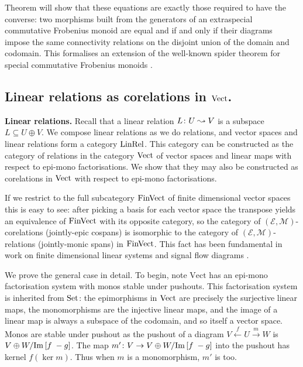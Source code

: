 Theorem will show that these equations are exactly those required to
have the converse: two morphisms built from the generators of an extraspecial
commutative Frobenius monoid are equal and if and only if their diagrams impose
the same connectivity relations on the disjoint union of the domain and
codomain. This formalises an extension of the well-known spider theorem for
special commutative Frobenius monoids \cite{CK,CPP}. 

\subsection{Linear relations as corelations in $\mathrm{Vect}$.}

\begin{example}
  \textbf{Linear relations.} 
  Recall that a linear relation $L{\colon} U \leadsto V$ is a subspace $L \subseteq
  U \oplus V$. We compose linear relations as we do relations, and vector spaces
  and linear relations form a category $\mathrm{LinRel}$. This category can be
  constructed as the category of relations in the category $\mathrm{Vect}$ of
  vector spaces and linear maps with respect to epi-mono factorisations. We show
  that they may also be constructed as corelations in $\mathrm{Vect}$ with respect to
  epi-mono factorisations.
  
  If we restrict to the full subcategory $\mathrm{FinVect}$ of finite dimensional vector
  spaces this is easy to see: after picking a basis for each vector space the
  transpose yields an equivalence of $\mathrm{FinVect}$ with its opposite category, so
  the category of $(\mathcal E,\mathcal M)$-corelations (jointly-epic cospans)
  is isomorphic to the category of $(\mathcal E,\mathcal M)$-relations
  (jointly-monic spans) in $\mathrm{FinVect}$. This fact has been fundamental in work on
  finite dimensional linear systems and signal flow diagrams \cite{BE,BSZ,FRS}.
  
  We prove the general case in detail. To begin, note $\mathrm{Vect}$ has an
  epi-mono factorisation system with monos stable under pushouts. This
  factorisation system is inherited from $\mathrm{Set}$: the epimorphisms in $\mathrm{Vect}$ are
  precisely the surjective linear maps, the monomorphisms are the injective
  linear maps, and the image of a linear map is always a subspace of the
  codomain, and so itself a vector space. Monos are stable under pushout as the
  pushout of a diagram $V \stackrel{f}{\leftarrow} U \stackrel{m}{\rightarrow}
  W$ is $V \oplus W/\mathrm{Im}\,[f\; -g]$. The map $m'{\colon} V \to V \oplus W/\mathrm{Im}\,[f\; -g]$
  into the pushout has kernel $f(\ker m)$. Thus when $m$ is a monomorphism, $m'$
  is too.
 

\end{example}
